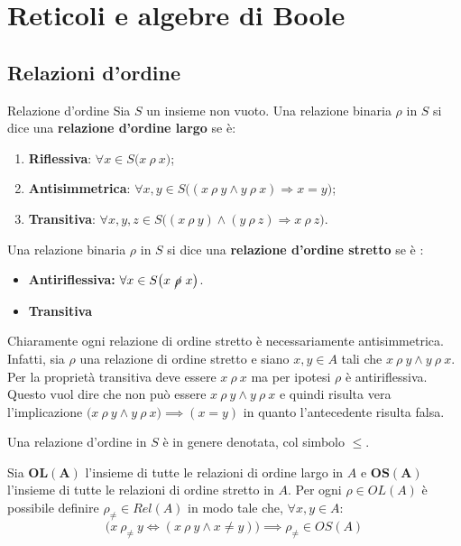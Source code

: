 \chapter{Reticoli e algebre di Boole}
\section{Relazioni d'ordine}

\begin{defbox}{Relazione d'ordine}
	Sia $S$ un insieme non vuoto. Una relazione binaria $\rho$ in $S$ si dice una \textbf{relazione d'ordine largo} se è:
	\begin{enumerate}
		\item \textbf{Riflessiva}: $\forall x \in S \bigl(x \ \rho \ x \bigr)$;
		\item \textbf{Antisimmetrica}: $\forall x,y \in S \bigl((x \ \rho \ y \wedge y \ \rho \ x) \Rightarrow x = y\bigr)$;
		\item \textbf{Transitiva}: $\forall x,y,z \in S \bigl((x \ \rho \ y) \wedge (y \ \rho \ z) \Rightarrow x \ \rho \ z \bigr)$.
	\end{enumerate}
	Una relazione binaria $\rho$ in $S$ si dice una \textbf{relazione d'ordine stretto} se è :
	\begin{itemize}
		\item \textbf{Antiriflessiva:} $\forall x \in S \bigl(x \ \cancel{\rho} \ x\bigr)$.
		\item \textbf{Transitiva}
	\end{itemize}
\end{defbox}

\begin{osservation}
	Chiaramente ogni relazione di ordine stretto è necessariamente antisimmetrica. Infatti, sia $\rho$ una relazione di ordine stretto e siano $x,y \in A$ tali che $x \ \rho \ y \land y \ \rho \ x$. Per la proprietà transitiva deve essere $x \ \rho \ x $ ma per ipotesi $\rho$ è antiriflessiva. Questo vuol dire che non può essere $x \ \rho \ y \land y \ \rho \ x$ e quindi risulta vera l'implicazione $\bigl(x \ \rho \ y \land y \ \rho \ x \bigr)\implies (x=y)$ in quanto l'antecedente risulta falsa.
\end{osservation}
 Una relazione d'ordine in $S$ è in genere denotata, col simbolo $\leq$.
\begin{propbox}
	Sia $\mathbf{OL(A)}$ l'insieme di tutte le relazioni di ordine largo in $A$ e $\mathbf{OS(A)}$ l'insieme di tutte le relazioni di ordine stretto in $A$. Per ogni $\rho \in OL(A)$ è possibile definire $\rho_{\neq} \in Rel(A)$ in modo tale che, $\forall x,y \in A$:
	\begin{displaymath}
		\bigl(x \ \rho_{\neq} \ y \iff (x \ \rho \ y \land x \neq y ) \bigr) \implies \rho_{\neq} \in OS(A)
	\end{displaymath}
\end{propbox}

